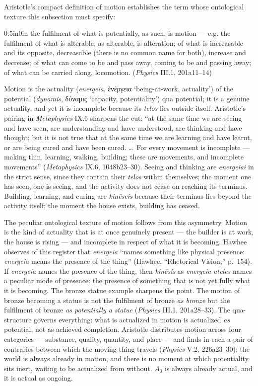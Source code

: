 \documentclass{article}
\newcommand{\gk}[1]{{\greekfont #1}}
\begin{document}
Aristotle's compact definition of motion establishes the term whose ontological texture this subsection must specify:
\begin{adjustwidth}{0.5in}{0in}
the fulfilment of what is potentially, as such, is motion --- e.g. the fulfilment of what is alterable, as alterable, is alteration; of what is increasable and its opposite, decreasable (there is no common name for both), increase and decrease; of what can come to be and pass away, coming to be and passing away; of what can be carried along, locomotion. (\textit{Physics} III.1, 201a11--14)
\end{adjustwidth}
Motion is the actuality (\textit{energeia}, \gk{ἐνέργεια} `being-at-work, actuality') of the potential (\textit{dynamis}, \gk{δύναμις} `capacity, potentiality') qua potential; it is a genuine actuality, and yet it is incomplete because its \textit{telos} lies outside itself. Aristotle's pairing in \textit{Metaphysics} IX.6 sharpens the cut: ``at the same time we are seeing and have seen, are understanding and have understood, are thinking and have thought; but it is not true that at the same time we are learning and have learnt, or are being cured and have been cured. \ldots\ For every movement is incomplete --- making thin, learning, walking, building; these are movements, and incomplete movements'' (\textit{Metaphysics} IX.6, 1048b23--30). Seeing and thinking are \textit{energeiai} in the strict sense, since they contain their \textit{telos} within themselves; the moment one has seen, one is seeing, and the activity does not cease on reaching its terminus. Building, learning, and curing are \textit{kinēseis} because their terminus lies beyond the activity itself; the moment the house exists, building has ceased.

The peculiar ontological texture of motion follows from this asymmetry. Motion is the kind of actuality that is at once genuinely present --- the builder is at work, the house is rising --- and incomplete in respect of what it is becoming. Hawhee observes of this register that \textit{energeia} ``names something like physical presence: \textit{energeia} means the presence of the thing'' (Hawhee, ``Rhetorical Vision,'' p.~154). If \textit{energeia} names the presence of the thing, then \textit{kinēsis} as \textit{energeia ateles} names a peculiar mode of presence: the presence of something that is not yet fully what it is becoming. The bronze statue example sharpens the point. The motion of bronze becoming a statue is not the fulfilment of bronze \textit{as bronze} but the fulfilment of bronze \textit{as potentially a statue} (\textit{Physics} III.1, 201a28--33). The qua-structure governs everything: what is actualized in motion is actualized \textit{as} potential, not as achieved completion. Aristotle distributes motion across four categories --- substance, quality, quantity, and place --- and finds in each a pair of contraries between which the moving thing travels (\textit{Physics} V.2, 226a23--30); the world is always already in motion, and there is no moment at which potentiality sits inert, waiting to be actualized from without. $A_0$ is always already actual, and it is actual as ongoing.
\end{document}
